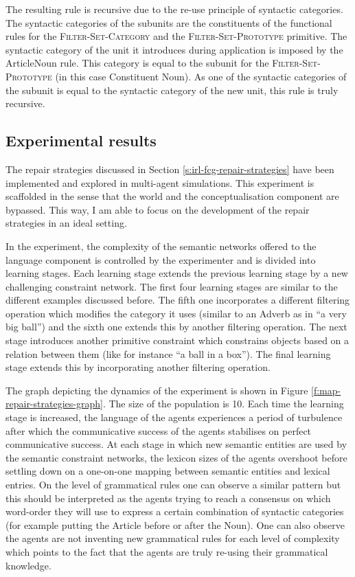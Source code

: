 The resulting rule is recursive due to the re-use principle of
syntactic categories. The syntactic categories of the subunits are
the constituents of the functional rules for the
\textsc{Filter-Set-Category} and the \textsc{Filter-Set-Prototype}
primitive. The syntactic category of the unit it introduces during
application is imposed by the ArticleNoun rule. This category is equal
to the subunit for the \textsc{Filter-Set-Prototype} (in this case
Constituent Noun). As one of the syntactic categories of the subunit
is equal to the syntactic category of the new unit, this rule is truly
recursive.

\subsection{Experimental results}
\label{s:irl-fcg-experimental-results}

The repair strategies discussed in Section
\ref{s:irl-fcg-repair-strategies} have been implemented and explored
in multi-agent simulations. This experiment is scaffolded in the sense
that the world and the conceptualisation component are bypassed. This
way, I am able to focus on the development of the repair strategies in
an ideal setting.

In the experiment, the complexity of the semantic networks offered to
the language component is controlled by the experimenter and is
divided into learning stages. Each learning stage extends the previous
learning stage by a new challenging constraint network. The first four
learning stages are similar to the different examples discussed
before. The fifth one incorporates a different filtering operation
which modifies the category it uses (similar to an Adverb as in ``a
very big ball'') and the sixth one extends this by another filtering
operation. The next stage introduces another primitive constraint
which constrains objects based on a relation between them (like for
instance ``a ball in a box''). The final learning stage extends this
by incorporating another filtering operation.

The graph depicting the dynamics of the experiment is shown in Figure
\ref{f:map-repair-strategies-graph}. The size of the population is
10. Each time the learning stage is increased, the language of the
agents experiences a period of turbulence after which the communicative
success of the agents stabilises on perfect communicative success. At
each stage in which new semantic entities are used by the semantic
constraint networks, the lexicon sizes of the agents overshoot before
settling down on a one-on-one mapping between semantic entities and
lexical entries. On the level of grammatical rules one can observe a
similar pattern but this should be interpreted as the agents trying to
reach a consensus on which word-order they will use to express a
certain combination of syntactic categories (for example putting the
Article before or after the Noun). One can also observe the agents are
not inventing new grammatical rules for each level of complexity which
points to the fact that the agents are truly re-using their
grammatical knowledge.

